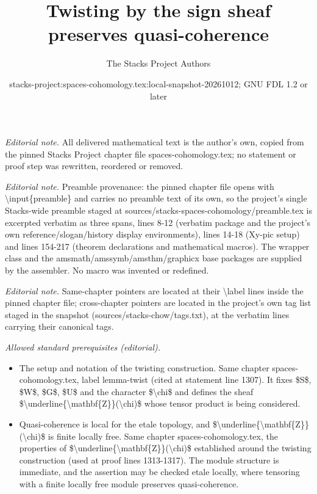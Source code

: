 \documentclass[10pt,a4paper]{amsart}
\title{Twisting by the sign sheaf preserves quasi-coherence}
\author{The Stacks Project Authors}
\date{stacks-project:spaces-cohomology.tex:local-snapshot-20261012; GNU FDL 1.2 or later}
\theoremstyle{plain}
\theoremstyle{definition}
\theoremstyle{remark}
\numberwithin{equation}{subsection}
\begin{document}
\maketitle
\noindent\textit{Editorial note.} All delivered mathematical text is the author's own, copied from the pinned Stacks Project chapter file spaces-cohomology.tex; no statement or proof step was rewritten, reordered or removed.\par\medskip
\noindent\textit{Editorial note.} Preamble provenance: the pinned chapter file opens with \textbackslash{}input\{preamble\} and carries no preamble text of its own, so the project's single Stacks-wide preamble staged at sources/stacks-spaces-cohomology/preamble.tex is excerpted verbatim as three spans, lines 8-12 (verbatim package and the project's own reference/slogan/history display environments), lines 14-18 (Xy-pic setup) and lines 154-217 (theorem declarations and mathematical macros). The wrapper class and the amsmath/amssymb/amsthm/graphicx base packages are supplied by the assembler. No macro was invented or redefined.\par\medskip
\noindent\textit{Editorial note.} Same-chapter pointers are located at their \textbackslash{}label lines inside the pinned chapter file; cross-chapter pointers are located in the project's own tag list staged in the snapshot (sources/stacks-chow/tags.txt), at the verbatim lines carrying their canonical tags.\par\medskip
\noindent\textit{Allowed standard prerequisites (editorial).}\begin{itemize}
\item The setup and notation of the twisting construction. Same chapter spaces-cohomology.tex, label lemma-twist (cited at statement line 1307). It fixes \$S\$, \$W\$, \$G\$, \$U\$ and the character \$\textbackslash{}chi\$ and defines the sheaf \$\textbackslash{}underline\{\textbackslash{}mathbf\{Z\}\}(\textbackslash{}chi)\$ whose tensor product is being considered.
\item Quasi-coherence is local for the etale topology, and \$\textbackslash{}underline\{\textbackslash{}mathbf\{Z\}\}(\textbackslash{}chi)\$ is finite locally free. Same chapter spaces-cohomology.tex, the properties of \$\textbackslash{}underline\{\textbackslash{}mathbf\{Z\}\}(\textbackslash{}chi)\$ established around the twisting construction (used at proof lines 1313-1317). The module structure is immediate, and the assertion may be checked etale locally, where tensoring with a finite locally free module preserves quasi-coherence.
\end{itemize}\medskip
\end{document}
